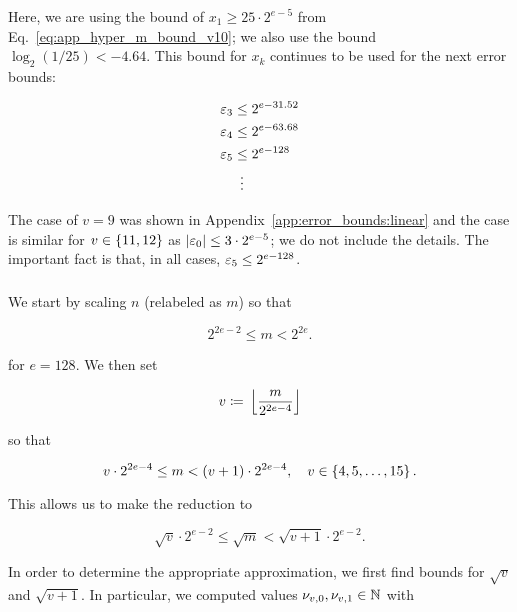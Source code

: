 \begin{itemize}
\noindent
Here, we are using the bound of $x_{1}\ge25\cdot2^{e-5}$
from Eq.~\eqref{eq:app_hyper_m_bound_v10};
we also use the bound $\log_{2}(1/25) < -4.64$.
This bound for $x_{k}$ continues to be used for the next error bounds:

\begin{align}
    \varepsilon_{3} &\le 2^{e-31.52} \nonumber\\
    \varepsilon_{4} &\le 2^{e-63.68} \nonumber\\
    \varepsilon_{5} &\le 2^{e-128} \nonumber\\
        &\ \vdots
\end{align}

The case of $v = 9$ was shown in Appendix~\ref{app:error_bounds:linear}
and the case is similar for $v\in\left\{ 11,12 \right\}$
as $\left| \varepsilon_{0} \right| \le 3\cdot2^{e-5}$;
we do not include the details.
The important fact is that, in all cases, $\varepsilon_{5}\le 2^{e-128}$.
\end{itemize}


\subsubsection{\LookupFour{}}
\label{app:error_bounds:lookup4}

We start by scaling $n$ (relabeled as $m$) so that

\begin{equation}
    2^{2e-2} \le m < 2^{2e}.
\end{equation}

\noindent
for $e = 128$.
We then set

\begin{equation}
    v \coloneqq{} \left\lfloor \frac{m}{2^{2e-4}} \right\rfloor
\end{equation}

\noindent
so that

\begin{equation}
    v\cdot2^{2e-4} \le m < \left( v+1 \right)\cdot2^{2e-4},
    \quad v\in\left\{ 4, 5, \dots, 15 \right\}.
\end{equation}

\noindent
This allows us to make the reduction to

\begin{equation}
    \sqrt{v}\cdot2^{e-2} \le \sqrt{m} < \sqrt{v+1}\cdot2^{e-2}.
    \label{eq:app_lookup4_m_bound}
\end{equation}

In order to determine the appropriate approximation,
we first find bounds for $\sqrt{v}$ and $\sqrt{v+1}$.
In particular, we computed values $\nu_{v,0}, \nu_{v,1}\in\mathbb{N}$ with

